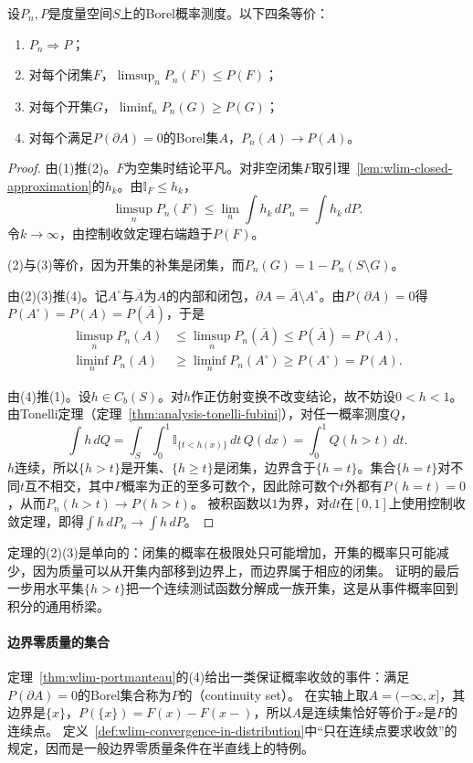 \begin{theorem}
\label{thm:wlim-portmanteau}
设$P_n,P$是度量空间$S$上的Borel概率测度。以下四条等价：
\begin{enumerate}
  \item $P_n\Rightarrow P$；
  \item 对每个闭集$F$，$\limsup_nP_n(F)\leq P(F)$；
  \item 对每个开集$G$，$\liminf_nP_n(G)\geq P(G)$；
  \item 对每个满足$P(\partial A)=0$的Borel集$A$，$P_n(A)\to P(A)$。
\end{enumerate}
\end{theorem}

\begin{proof}
由(1)推(2)。$F$为空集时结论平凡。对非空闭集$F$取引理~\ref{lem:wlim-closed-approximation}的$h_k$。由$\mathbb I_F\leq h_k$，
\[
  \limsup_nP_n(F)\leq\lim_n\int h_k\,dP_n=\int h_k\,dP.
\]
令$k\to\infty$，由控制收敛定理右端趋于$P(F)$。

(2)与(3)等价，因为开集的补集是闭集，而$P_n(G)=1-P_n(S\setminus G)$。

由(2)(3)推(4)。记$A^\circ$与$\overline A$为$A$的内部和闭包，$\partial A=\overline A\setminus A^\circ$。由$P(\partial A)=0$得$P(A^\circ)=P(A)=P(\overline A)$，于是
\[
  \begin{aligned}
  \limsup_nP_n(A)&\leq\limsup_nP_n(\overline A)\leq P(\overline A)=P(A),\\
  \liminf_nP_n(A)&\geq\liminf_nP_n(A^\circ)\geq P(A^\circ)=P(A).
  \end{aligned}
\]

由(4)推(1)。设$h\in C_b(S)$。对$h$作正仿射变换不改变结论，故不妨设$0<h<1$。由Tonelli定理（定理~\ref{thm:analysis-tonelli-fubini}），对任一概率测度$Q$，
\[
  \int h\,dQ=\int_S\int_0^1\mathbb I_{\{t<h(x)\}}\,dt\,Q(dx)=\int_0^1Q(h>t)\,dt.
\]
$h$连续，所以$\{h>t\}$是开集、$\{h\geq t\}$是闭集，边界含于$\{h=t\}$。集合$\{h=t\}$对不同$t$互不相交，其中$P$概率为正的至多可数个，因此除可数个$t$外都有$P(h=t)=0$，从而$P_n(h>t)\to P(h>t)$。
被积函数以$1$为界，对$dt$在$[0,1]$上使用控制收敛定理，即得$\int h\,dP_n\to\int h\,dP$。
\end{proof}

定理的(2)(3)是单向的：闭集的概率在极限处只可能增加，开集的概率只可能减少，因为质量可以从开集内部移到边界上，而边界属于相应的闭集。
证明的最后一步用水平集$\{h>t\}$把一个连续测试函数分解成一族开集，这是从事件概率回到积分的通用桥梁。

\paragraph{边界零质量的集合}
定理~\ref{thm:wlim-portmanteau}的(4)给出一类保证概率收敛的事件：满足$P(\partial A)=0$的Borel集合称为$P$的（continuity set）。
在实轴上取$A=(-\infty,x]$，其边界是$\{x\}$，$P(\{x\})=F(x)-F(x-)$，所以$A$是连续集恰好等价于$x$是$F$的连续点。
定义~\ref{def:wlim-convergence-in-distribution}中“只在连续点要求收敛”的规定，因而是一般边界零质量条件在半直线上的特例。

